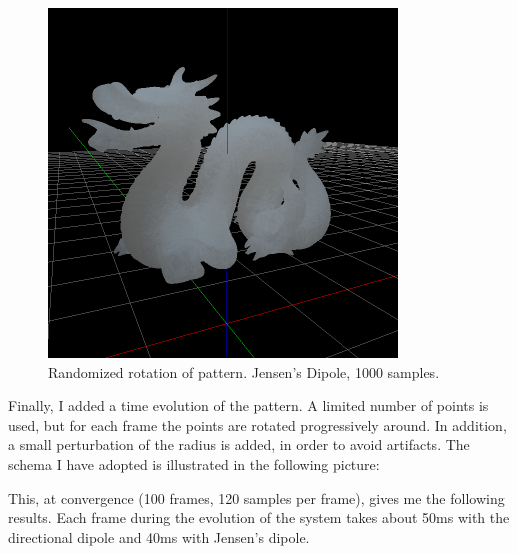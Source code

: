 \documentclass[12pt, twoside,a4paper]{article}
\begin{document}
\vspace{0.5cm}
\begin{figure}[!h]
\centering
\includegraphics[width=350px]{jensen_1000_onepass.png}
\caption{Randomized rotation of pattern. Jensen's Dipole, 1000 samples.}
\label{fig:img}
\end{figure}

\clearpage
Finally, I added a time evolution of the pattern. A limited number of points is used, but for each frame the points are rotated progressively around. In addition, a small perturbation of the radius is added, in order to avoid artifacts. The schema I have adopted is illustrated in the following picture:


\clearpage
This, at convergence (100 frames, 120 samples per frame), gives me the following results. Each frame during the evolution of the system takes about 50ms with the directional dipole and 40ms with Jensen's dipole.


\clearpage
\end{document}
